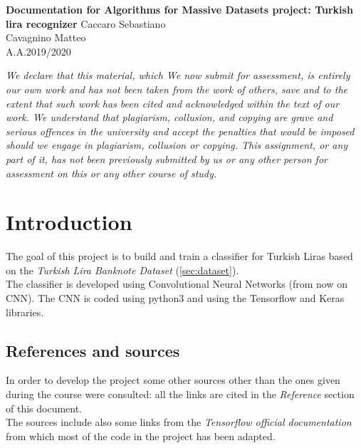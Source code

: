\documentclass[a4paper,12pt]{article}
\begin{document}
\begin{titlepage}
\begin{center}
	\Large{\textbf{Documentation for Algorithms for Massive Datasets project: Turkish lira recognizer}}
\vfill
\normalsize{Caccaro Sebastiano}\\
\normalsize{Cavagnino Matteo}\\
\normalsize{A.A.2019/2020}
\end{center}
\end{titlepage}

\vspace*{\fill}
\textit{We declare that this material, which We now submit for assessment, is entirely our own work and has not been taken from the work of others, save and to the extent that such work has been cited and acknowledged within the text of our work. We understand that plagiarism, collusion, and copying are grave and serious offences in the university and accept the penalties that would be imposed should we engage in plagiarism, collusion or copying. This assignment, or any part of it, has not been previously submitted by us or any other person for assessment on this or any other course of study.}
\vspace*{\fill}

\newpage

\tableofcontents

\clearpage


\newpage
\section{Introduction}

The goal of this project is to build and train a classifier for Turkish Liras based on the \textit{Turkish Lira Banknote Dataset} (\autoref{sec:dataset}).\\
The classifier is developed using Convolutional Neural Networks (from now on CNN). The CNN is coded using python3 and using the Tensorflow and Keras libraries.

\subsection{References and sources}
In order to develop the project some other sources other than the ones given during the course were consulted: all the links are cited in the \textit{Reference} section of this document.\\
The sources include also some links from the \textit{Tensorflow official documentation} from which most of the code in the project has been adapted.
\end{document}
